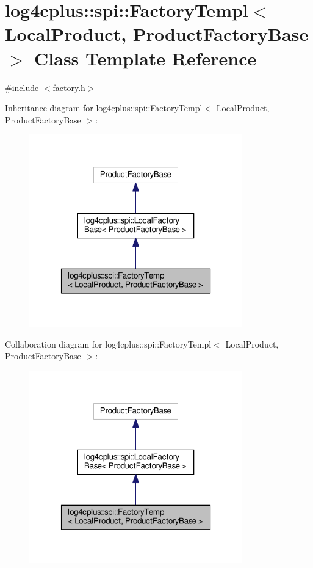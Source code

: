 \hypertarget{classlog4cplus_1_1spi_1_1FactoryTempl}{\section{log4cplus\-:\-:spi\-:\-:Factory\-Templ$<$ Local\-Product, Product\-Factory\-Base $>$ Class Template Reference}
\label{classlog4cplus_1_1spi_1_1FactoryTempl}
}


{\ttfamily \#include $<$factory.\-h$>$}



Inheritance diagram for log4cplus\-:\-:spi\-:\-:Factory\-Templ$<$ Local\-Product, Product\-Factory\-Base $>$\-:
\nopagebreak
\begin{figure}[H]
\begin{center}
\leavevmode
\includegraphics[width=262pt]{classlog4cplus_1_1spi_1_1FactoryTempl__inherit__graph}
\end{center}
\end{figure}


Collaboration diagram for log4cplus\-:\-:spi\-:\-:Factory\-Templ$<$ Local\-Product, Product\-Factory\-Base $>$\-:
\nopagebreak
\begin{figure}[H]
\begin{center}
\leavevmode
\includegraphics[width=262pt]{classlog4cplus_1_1spi_1_1FactoryTempl__coll__graph}
\end{center}
\end{figure}

